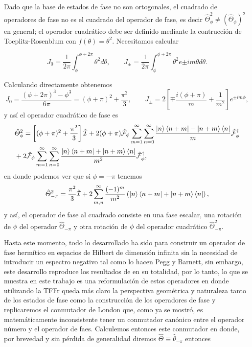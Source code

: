            Dado que la base de estados de fase no son ortogonales, el cuadrado de operadores de fase no es el cuadrado del operador de fase, es decir $\hat{\Theta}_\phi^2 \neq \left(\hat{\Theta}_\phi\right)^2$ en general; el operador cuadrático debe ser definido mediante la contrucción de Toeplitz-Rosenblum con $f(\theta) = \theta^2$. Necesitamos calcular

            \begin{equation*}
                J_0 = \frac{1}{2\pi}\int_\phi^{\phi+2\pi} \theta^2 d\theta, \qquad J_\pm = \frac{1}{2\pi} \int_\phi^{\phi+2\pi} \theta^2e
                {\pm im\theta}d\theta.
            \end{equation*}

            Calculando directamente obtenemos
            \begin{equation*}
                J_0 = \frac{\left(\phi + 2\pi\right)^3 - \phi^3}{6\pi} = (\phi + \pi)^2 + \frac{\pi^2}{3}, \qquad J_\pm = 2\left[\mp \frac{i(\phi + \pi)}{m} + \frac{1}{m^2} \right]e^{\pm im\phi}, 
            \end{equation*}
            y así el operador cuadrático de fase es
            \begin{align}\label{eq:Cap3OperadorHermiticoFaseCuadradoFourier}
                & \hat{\Theta}_\phi^2 = \left[(\phi + \pi)^2 + \frac{\pi^2}{3} \right]\hat{\mathcal{I}} + 2(\phi + \pi)\hat{\mathcal{F}}_\phi \sum_{m=1}^{\infty}\sum_{n=0}^{\infty}\frac{\ket{n}\bra{n+m} - \ket{n+m}\bra{n}}{m} \hat{\mathcal{F}}_\phi^\dagger \nonumber\\
                & + 2\hat{\mathcal{F}}_\phi \sum_{m=1}^{\infty}\sum_{n=0}^{\infty}\frac{\ket{n}\bra{n+m} + \ket{n+m}\bra{n}}{m^2} \hat{\mathcal{F}}_\phi^\dagger,
            \end{align}
            en donde podemos ver que si $\phi = -\pi$ tenemos
            \begin{equation}
                \hat{\Theta}_{-\pi}^2 = \frac{\pi^2}{3}\hat{\mathcal{I}} + 2 \sum_{m,n}^{\infty}\frac{(-1)^m}{m^2}\left(\ket{n}\bra{n+m} + \ket{n+m}\bra{n} \right),
            \end{equation}
            y así, el operador de fase al cuadrado consiste en una fase escalar, una rotación de $\phi$ del operador $\hat{\Theta}_{-\pi}$ y otra rotación de $\phi$ del operador cuadrático $\hat{\Theta}_{-\pi}^2$. 

            Hasta este momento, todo lo desarrollado ha sido para construir un operador de fase hermítico en espacios de Hilbert de dimensión infinita sin la necesidad de introducir un espectro negativo tal como lo hacen Pegg y Barnett, sin embargo, este desarrollo reproduce los resultados de \cite{Bergou1991} en su totalidad, por lo tanto, lo que se muestra en este trabajo es una reformulación de estos operadores en donde utilizando la TFFr queda más claro la perspectiva geométrica y naturaleza tanto de los estados de fase como la construcción de los operadores de fase y replicaremos el conmutador de London que, como ya se mostró, es matemáticamente inconsistente tener un conmutador canónico entre el operador número y el operador de faes. Calculemos entonces este conmutador en donde, por brevedad y sin pérdida de generalidad diremos $\hat{\Theta} \equiv \hat{\theta}_{-\pi}$ entonces

